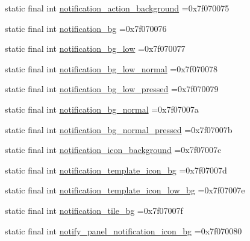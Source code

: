 \begin{DoxyCompactItemize}
\item 
static final int \mbox{\hyperlink{classcom_1_1example_1_1trainawearapplication_1_1_r_1_1drawable_aa71b853bd5e99d95f545d98564047751}{notification\+\_\+action\+\_\+background}} =0x7f070075
\item 
static final int \mbox{\hyperlink{classcom_1_1example_1_1trainawearapplication_1_1_r_1_1drawable_af2336325049648b350c26bb8dc32abcb}{notification\+\_\+bg}} =0x7f070076
\item 
static final int \mbox{\hyperlink{classcom_1_1example_1_1trainawearapplication_1_1_r_1_1drawable_aa56749ca4e8c8be42298d421621a0697}{notification\+\_\+bg\+\_\+low}} =0x7f070077
\item 
static final int \mbox{\hyperlink{classcom_1_1example_1_1trainawearapplication_1_1_r_1_1drawable_aff787ebc46a8b5d605e25324f757b339}{notification\+\_\+bg\+\_\+low\+\_\+normal}} =0x7f070078
\item 
static final int \mbox{\hyperlink{classcom_1_1example_1_1trainawearapplication_1_1_r_1_1drawable_a887865514b4810d4c071946cccee51a5}{notification\+\_\+bg\+\_\+low\+\_\+pressed}} =0x7f070079
\item 
static final int \mbox{\hyperlink{classcom_1_1example_1_1trainawearapplication_1_1_r_1_1drawable_a1e639d6e53d7496b811ff1d2e7e6fabb}{notification\+\_\+bg\+\_\+normal}} =0x7f07007a
\item 
static final int \mbox{\hyperlink{classcom_1_1example_1_1trainawearapplication_1_1_r_1_1drawable_a6bb72b5cf817b809340bf21f9d3b53d0}{notification\+\_\+bg\+\_\+normal\+\_\+pressed}} =0x7f07007b
\item 
static final int \mbox{\hyperlink{classcom_1_1example_1_1trainawearapplication_1_1_r_1_1drawable_a6e8ac46a3b07eefc925b68dfd9634cf0}{notification\+\_\+icon\+\_\+background}} =0x7f07007c
\item 
static final int \mbox{\hyperlink{classcom_1_1example_1_1trainawearapplication_1_1_r_1_1drawable_a183a8248577f6900fdf329334e87eb90}{notification\+\_\+template\+\_\+icon\+\_\+bg}} =0x7f07007d
\item 
static final int \mbox{\hyperlink{classcom_1_1example_1_1trainawearapplication_1_1_r_1_1drawable_ae2420b84d5f22b46b965c4e0c0a07ce4}{notification\+\_\+template\+\_\+icon\+\_\+low\+\_\+bg}} =0x7f07007e
\item 
static final int \mbox{\hyperlink{classcom_1_1example_1_1trainawearapplication_1_1_r_1_1drawable_ad4ad29a3fdf18ba02769dee59c47c7e9}{notification\+\_\+tile\+\_\+bg}} =0x7f07007f
\item 
static final int \mbox{\hyperlink{classcom_1_1example_1_1trainawearapplication_1_1_r_1_1drawable_acde75c230a095ed9b45099aae3916944}{notify\+\_\+panel\+\_\+notification\+\_\+icon\+\_\+bg}} =0x7f070080

\end{DoxyCompactItemize}
